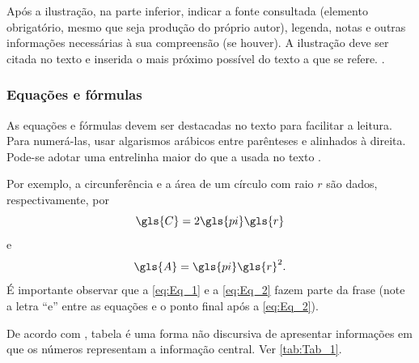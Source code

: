 \begin{citacao}
	Após a ilustração, na parte inferior, indicar a fonte consultada (elemento obrigatório, mesmo que seja produção do próprio autor), legenda, notas e outras informações necessárias à sua compreensão (se houver). A ilustração deve ser citada no texto e inserida o mais próximo possível do texto a que se refere. \cite[p. 11]{NBR14724:2011}.
\end{citacao}

\subsubsection{Equações e fórmulas}

As equações e fórmulas devem ser destacadas no texto para facilitar a leitura.  Para numerá-las, usar algarismos arábicos entre parênteses e alinhados à direita. Pode-se adotar uma entrelinha maior do que a usada no texto \cite{NBR14724:2011}.

Por exemplo, a circunferência e a área de um círculo com raio $r$ são dados, respectivamente, por
\begin{equation}\label{eq:Eq_1}
	\gls{C} = 2 \gls{pi} \gls{r}    %
\end{equation}
e
\begin{equation}\label{eq:Eq_2}
	\gls{A} = \gls{pi} \gls{r}^2.
\end{equation}
É importante observar que a \autoref{eq:Eq_1} e a \autoref{eq:Eq_2} fazem parte da frase (note a letra ``e'' entre as equações e o ponto final após a \autoref{eq:Eq_2}).


De acordo com \textcite{ibge1993}, tabela é uma forma não discursiva de apresentar informações em que os números representam a informação central. Ver \autoref{tab:Tab_1}.

